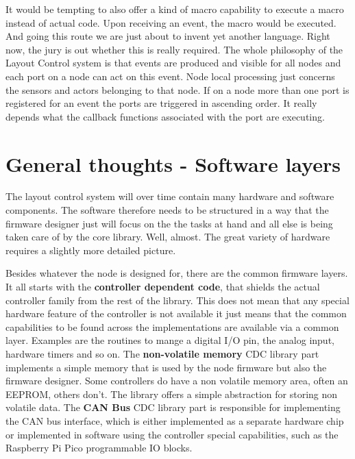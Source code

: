 It would be tempting to also offer a kind of macro capability to execute a macro instead of actual code. Upon receiving an event, the macro would be executed. And going this route we are just about to invent yet another language. Right now, the jury is out whether this is really required. The whole philosophy of the Layout Control system is that events are produced and visible for all nodes and each port on a node can act on this event. Node local processing just concerns the sensors and actors belonging to that node. If on a node more than one port is registered for an event the ports are triggered in ascending order. It really depends what the callback functions associated with the port are executing.

\section{General thoughts - Software layers}

The layout control system will over time contain many hardware and software components. The software therefore needs to be structured in a way that the firmware designer just will focus on the the tasks at hand and all else is being taken care of by the core library. Well, almost. The great variety of hardware requires a slightly more detailed picture.

\begin{center}
\end{center}

Besides whatever the node is designed for, there are the common firmware layers. It all starts with the \textbf{controller dependent code}, that shields the actual controller family from the rest of the library. This does not mean that any special hardware feature of the controller is not available it just means that the common capabilities to be found across the implementations are available via a common layer. Examples are the routines to mange a digital I/O pin, the analog input, hardware timers and so on. The \textbf{non-volatile memory} CDC library part implements a simple memory that is used by the node firmware but also the firmware designer. Some controllers do have a non volatile memory area, often an EEPROM, others don't. The library offers a simple abstraction for storing non volatile data. The \textbf{ CAN Bus} CDC library part is responsible for implementing the CAN bus interface, which is either implemented as a separate hardware chip or implemented in software using the controller special capabilities, such as the Raspberry Pi Pico programmable IO blocks.

